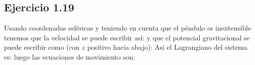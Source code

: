 \subsection*{Ejercicio 1.19}
Usando coordenadas esf\'ericas y teniendo en cuenta que el p\'endulo es inextensible tenemos que la velocidad se puede escribir as\'i:
y que el potencial gravitacional se puede escribir como (con $z$ positivo hacia abajo):
Asi el Lagrangiano del sistema es:
luego las ecuaciones de movimiento son:


